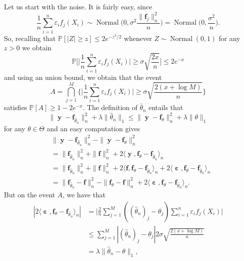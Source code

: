\documentclass[
	fontsize=11pt, %
	twoside=false, %
	numbers=noenddot, %
]{kaobook}
\renewcommand{\bf}{{\boldsymbol f}}
\DeclareMathOperator{\by}{{\boldsymbol y}}
\DeclareMathOperator{\beps}{\boldsymbol \varepsilon}
\DeclareMathOperator{\nor}{Normal}
\newcommand{\eps}{\varepsilon}
\renewcommand{\P}{\mathbb P}
\newcommand{\wh}{\widehat}
\newcommand{\norm}[1]{\| #1 \|}
\newcommand{\inr}[1]{\langle #1 \rangle}
\begin{document}
Let us start with the noise. It is fairly easy, since
\begin{equation*}
	\frac 1n \sum_{i=1}^n \eps_i f_j(X_i) \sim 
	\nor\Big( 0, \sigma^2 \frac{\norm{\bf_j}_n^2}{n} \Big) 
	= \nor\Big( 0, \frac{\sigma^2}{n} \Big).
\end{equation*}
So, recalling that $\P[|Z| \geq z] \leq 2e^{-z^2 / 2}$ whenever $Z \sim \nor(0, 1)$ for any $z > 0$%
we obtain
\begin{equation*}
	\P \bigg[ \Big| \frac 1n \sum_{i=1}^n \eps_i f_j(X_i) \Big| \geq \sigma \sqrt{\frac{2 x}{n}} \bigg] \leq 2 e^{-x}
\end{equation*}
and using an union bound, we obtain that the event
\begin{equation*}
	A = \bigcap_{j=1}^M \bigg\{ \Big| \frac 1n \sum_{i=1}^n \eps_i f_j(X_i) \Big| \geq \sigma \sqrt{\frac{2 (x + \log M)}{n}} \bigg\}
\end{equation*}
satisfies $\P[A] \geq 1 - 2e^{-x}$.
The definition of $\wh \theta_n$ entails that
\begin{equation}
	\label{eq:proof-oracle-slow-step1}
	\norm{\by - \bf_{\wh \theta_n}}_n^2 + \lambda \norm{\wh \theta_n}_1 
	\leq \norm{\by - \bf_\theta}_n^2 + \lambda \norm{\theta}_1
\end{equation}
for any $\theta \in \Theta$ and an easy computation gives
\begin{equation}
	\label{eq:proof-oracle-slow-step2}
	\begin{split}
	&\norm{\by - \bf_{\wh \theta_n}}_n^2 - \norm{\by - \bf_\theta}_n^2 \\
	&= \norm{\bf_{\wh \theta_n}}_n^2 + \norm{\bf}_n^2 + 2 \inr{\by, \bf_{\theta} - \bf_{\wh \theta_n}}_n \\
	&= \norm{\bf_{\wh \theta_n}}_n^2 + \norm{\bf}_n^2 + 2 \inr{\bf, \bf_{\theta} - \bf_{\wh \theta_n}}_n + 2 \inr{\beps, \bf_{\theta} - \bf_{\wh \theta_n}}_n \\
	&= \norm{\bf_{\wh \theta_n} - \bf}_n^2 - \norm{\bf_\theta - \bf}_n^2 + 
	2 \inr{\beps, \bf_{\theta} - \bf_{\wh \theta_n}}_n.
	\end{split}
\end{equation}
But on the event $A$, we have that
\begin{equation}
	\label{eq:proof-oracle-slow-step3}
	\begin{split}
	| 2 \inr{\beps, \bf_{\theta} - \bf_{\wh \theta_n}}_n | 
	&= \Big| \frac 2n \sum_{j=1}^M ((\wh \theta_n)_j - \theta_j ) 
	\sum_{i=1}^n \eps_i f_j(X_i) \Big| \\
	&\leq \sum_{j=1}^M | (\wh \theta_n)_j - \theta_j | 2 \sigma \sqrt{\frac{2 (x + \log M)}{n}} \\
	&= \lambda \norm{\wh \theta_n - \theta}_1,	
	\end{split}
\end{equation}
\end{document}
